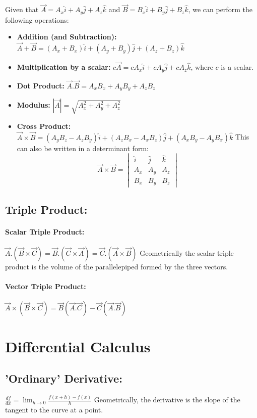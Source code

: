 \documentclass{article}
\begin{document}
Given that $\vec{A} = A_x \hat{i} + A_y \hat{j} + A_z \hat{k}$ and $\vec{B} = B_x \hat{i} + B_y \hat{j} + B_z \hat{k}$, we can perform the following operations:
\begin{itemize}
	\item \textbf{Addition (and Subtraction):} $\vec{A} + \vec{B} = (A_x + B_x) \hat{i} + (A_y + B_y) \hat{j} + (A_z + B_z) \hat{k}$
	\item \textbf{Multiplication by a scalar: } $c\vec{A} = cA_x \hat{i} + cA_y \hat{j} + cA_z \hat{k}$, where $c$ is a scalar.
	\item \textbf{Dot Product: } $\vec{A}.\vec{B} = A_xB_x + A_yB_y + A_zB_z$
	\item \textbf{Modulus: } $|\vec{A}| = \sqrt{A_x^2 + A_y^2 + A_z^2}$
	\item \textbf{Cross Product: } $\vec{A} \times \vec{B} = (A_yB_z - A_zB_y) \hat{i} + (A_zB_x - A_xB_z) \hat{j} + (A_xB_y - A_yB_x) \hat{k}$
	      This can also be written in a determinant form:
	      \[\vec{A} \times \vec{B} = \begin{vmatrix}
			      \hat{i} & \hat{j} & \hat{k} \\
			      A_x     & A_y     & A_z     \\
			      B_x     & B_y     & B_z
		      \end{vmatrix}\]
\end{itemize}
\subsection{Triple Product: }
\paragraph*{Scalar Triple Product: } $\vec{A}.(\vec{B} \times \vec{C}) = \vec{B}.(\vec{C} \times \vec{A}) = \vec{C}.(\vec{A} \times \vec{B})$
Geometrically the scalar triple product is the volume of the parallelepiped formed by the three vectors.
\paragraph*{Vector Triple Product: } $\vec{A} \times (\vec{B} \times \vec{C}) = \vec{B}(\vec{A}.\vec{C}) - \vec{C}(\vec{A}.\vec{B})$

\section{Differential Calculus}
\subsection{'Ordinary' Derivative: } $\frac{df}{dx} = \lim_{h \to 0} \frac{f(x+h) - f(x)}{h}$
Geometrically, the derivative is the slope of the tangent to the curve at a point.
\end{document}

